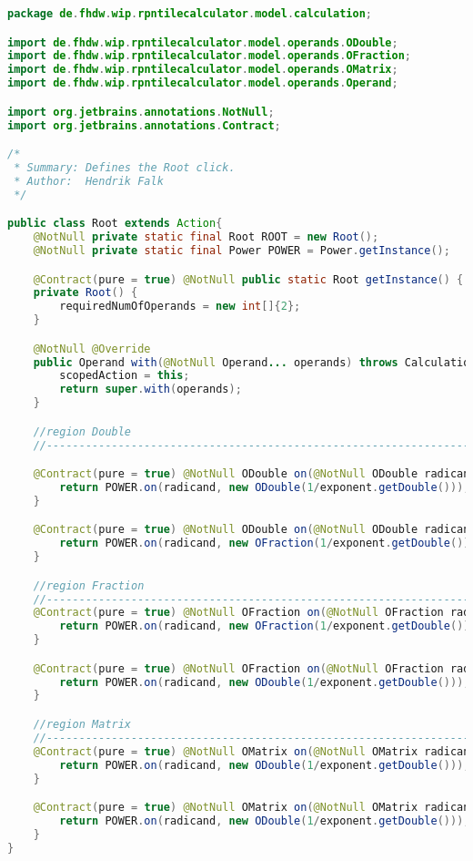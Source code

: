 \begin{lstlisting}[caption=Root (Falk),label=list:Root,language=Java]
package de.fhdw.wip.rpntilecalculator.model.calculation;

import de.fhdw.wip.rpntilecalculator.model.operands.ODouble;
import de.fhdw.wip.rpntilecalculator.model.operands.OFraction;
import de.fhdw.wip.rpntilecalculator.model.operands.OMatrix;
import de.fhdw.wip.rpntilecalculator.model.operands.Operand;

import org.jetbrains.annotations.NotNull;
import org.jetbrains.annotations.Contract;

/*
 * Summary: Defines the Root click.
 * Author:  Hendrik Falk
 */

public class Root extends Action{
    @NotNull private static final Root ROOT = new Root();
    @NotNull private static final Power POWER = Power.getInstance();

    @Contract(pure = true) @NotNull public static Root getInstance() { return ROOT; }
    private Root() {
        requiredNumOfOperands = new int[]{2};
    }

    @NotNull @Override
    public Operand with(@NotNull Operand... operands) throws CalculationException {
        scopedAction = this;
        return super.with(operands);
    }

    //region Double
    //------------------------------------------------------------------------------------

    @Contract(pure = true) @NotNull ODouble on(@NotNull ODouble radicand, @NotNull ODouble exponent) {
        return POWER.on(radicand, new ODouble(1/exponent.getDouble()));
    }

    @Contract(pure = true) @NotNull ODouble on(@NotNull ODouble radicand, @NotNull OFraction exponent){
        return POWER.on(radicand, new OFraction(1/exponent.getDouble()));
    }

    //region Fraction
    //------------------------------------------------------------------------------------
    @Contract(pure = true) @NotNull OFraction on(@NotNull OFraction radicand, @NotNull ODouble exponent){
        return POWER.on(radicand, new OFraction(1/exponent.getDouble()));
    }

    @Contract(pure = true) @NotNull OFraction on(@NotNull OFraction radicand, @NotNull OFraction exponent){
        return POWER.on(radicand, new ODouble(1/exponent.getDouble()));
    }

    //region Matrix
    //------------------------------------------------------------------------------------
    @Contract(pure = true) @NotNull OMatrix on(@NotNull OMatrix radicand, @NotNull ODouble exponent) {
        return POWER.on(radicand, new ODouble(1/exponent.getDouble()));
    }

    @Contract(pure = true) @NotNull OMatrix on(@NotNull OMatrix radicand, @NotNull OFraction exponent) {
        return POWER.on(radicand, new ODouble(1/exponent.getDouble()));
    }
}

\end{lstlisting}    

